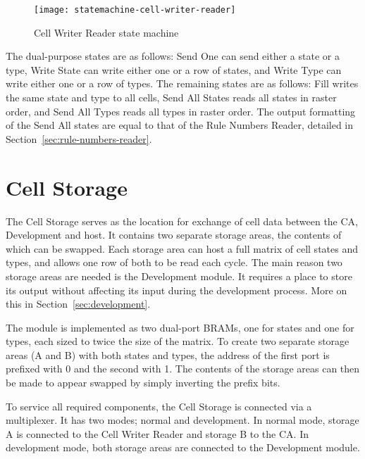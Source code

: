 \begin{figure}[!ht]
    \centering
    \texttt{[image: statemachine-cell-writer-reader]}
    \caption{Cell Writer Reader state machine}
    \label{fig:statemachine-cell-writer-reader}
\end{figure}

The dual-purpose states are as follows:
Send One can send either a state or a type, Write State can write either one or a row of states, and Write Type can write either one or a row of types.
The remaining states are as follows:
Fill writes the same state and type to all cells, Send All States reads all states in raster order, and Send All Types reads all types in raster order.
The output formatting of the Send All states are equal to that of the Rule Numbers Reader, detailed in Section~\ref{sec:rule-numbers-reader}.


\section{Cell Storage}

The Cell Storage serves as the location for exchange of cell data between the CA, Development and host.
It contains two separate storage areas, the contents of which can be swapped.
Each storage area can host a full matrix of cell states and types, and allows one row of both to be read each cycle.
The main reason two storage areas are needed is the Development module.
It requires a place to store its output without affecting its input during the development process.
More on this in Section~\ref{sec:development}.

The module is implemented as two dual-port BRAMs, one for states and one for types, each sized to twice the size of the matrix.
To create two separate storage areas (A and B) with both states and types, the address of the first port is prefixed with 0 and the second with 1.
The contents of the storage areas can then be made to appear swapped by simply inverting the prefix bits.

To service all required components, the Cell Storage is connected via a multiplexer.
It has two modes; normal and development.
In normal mode, storage A is connected to the Cell Writer Reader and storage B to the CA.
In development mode, both storage areas are connected to the Development module.



